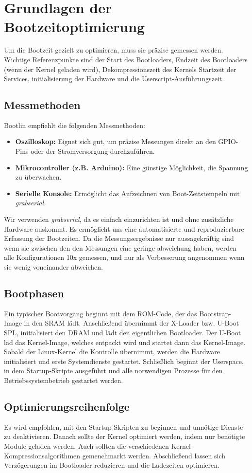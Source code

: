 
\section{Grundlagen der Bootzeitoptimierung}
Um die Bootzeit gezielt zu optimieren, muss sie präzise gemessen werden. Wichtige Referenzpunkte sind der
Start des Bootloaders, Endzeit des Bootloaders (wenn der Kernel geladen wird), Dekompressionszeit des Kernels
Startzeit der Services, initialisierung der Hardware und die Userscript-Ausführungszeit.

\subsection{Messmethoden}
Bootlin empfiehlt die folgenden Messmethoden:
\begin{itemize}
	\item \textbf{Oszilloskop:} Eignet sich gut, um präzise Messungen direkt an den GPIO-Pins oder der Stromversorgung durchzuführen.
	\item \textbf{Mikrocontroller (z.B. Arduino):} Eine günstige Möglichkeit, die Spannung zu überwachen.
	\item \textbf{Serielle Konsole:} Ermöglicht das Aufzeichnen von Boot-Zeitstempeln mit \textit{grabserial}.
\end{itemize}

Wir verwenden \textit{grabserial}, da es einfach einzurichten ist und ohne zusätzliche Hardware auskommt. Es
ermöglicht uns eine automatisierte und reproduzierbare Erfassung der Bootzeiten. Da die Messungsergebnisse nur
aussagekräftig sind wenn sie zwischen den den Messungen eine geringe abweichung haben, werden alle
Konfigurationen 10x gemessen, und nur als Verbesserung angenommen wenn sie wenig voneinander abweichen.

\subsection{Bootphasen}
Ein typischer Bootvorgang beginnt mit dem ROM-Code, der das Bootstrap-Image in den SRAM lädt. Anschließend
übernimmt der X-Loader bzw. U-Boot SPL, initialisiert den DRAM und lädt den eigentlichen Bootloader. Der
U-Boot läd das Kernel-Image, welches entpackt wird und startet dann das Kernel-Image. Sobald der Linux-Kernel
die Kontrolle übernimmt, werden die Hardware initialisiert und erste Systemdienste gestartet. Schließlich
beginnt der Userspace, in dem Startup-Skripte ausgeführt und alle notwendigen Prozesse für den
Betriebssystembetrieb gestartet werden.

\subsection{Optimierungsreihenfolge}
Es wird empfohlen, mit den Startup-Skripten zu beginnen und unnötige Dienste zu deaktivieren. Danach sollte
der Kernel optimiert werden, indem nur benötigte Module geladen werden. Auch sollten die verschiedenen
Kernel-Kompressionsalgorithmen gemenchmarkt werden. Abschließend lassen sich Verzögerungen im Bootloader
reduzieren und die Ladezeiten optimieren.
